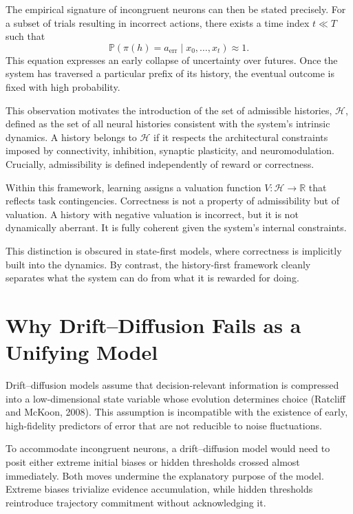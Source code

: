 \documentclass[11pt]{article}
\newcommand{\histories}{\mathcal{H}}
\newcommand{\valuation}{V}
\newcommand{\prob}{\mathbb{P}}
\begin{document}
The empirical signature of incongruent neurons can then be stated precisely. For a subset of trials resulting in incorrect actions, there exists a time index $t \ll T$ such that
\[
\prob(\pi(h) = a_{\text{err}} \mid x_0, \ldots, x_t) \approx 1.
\]
This equation expresses an early collapse of uncertainty over futures. Once the system has traversed a particular prefix of its history, the eventual outcome is fixed with high probability.

This observation motivates the introduction of the set of admissible histories, $\histories$, defined as the set of all neural histories consistent with the system’s intrinsic dynamics. A history belongs to $\histories$ if it respects the architectural constraints imposed by connectivity, inhibition, synaptic plasticity, and neuromodulation. Crucially, admissibility is defined independently of reward or correctness.

Within this framework, learning assigns a valuation function $\valuation : \histories \to \mathbb{R}$ that reflects task contingencies. Correctness is not a property of admissibility but of valuation. A history with negative valuation is incorrect, but it is not dynamically aberrant. It is fully coherent given the system’s internal constraints.

This distinction is obscured in state-first models, where correctness is implicitly built into the dynamics. By contrast, the history-first framework cleanly separates what the system can do from what it is rewarded for doing.

\section{Why Drift–Diffusion Fails as a Unifying Model}

Drift–diffusion models assume that decision-relevant information is compressed into a low-dimensional state variable whose evolution determines choice (Ratcliff and McKoon, 2008). This assumption is incompatible with the existence of early, high-fidelity predictors of error that are not reducible to noise fluctuations.

To accommodate incongruent neurons, a drift–diffusion model would need to posit either extreme initial biases or hidden thresholds crossed almost immediately. Both moves undermine the explanatory purpose of the model. Extreme biases trivialize evidence accumulation, while hidden thresholds reintroduce trajectory commitment without acknowledging it.
\end{document}
